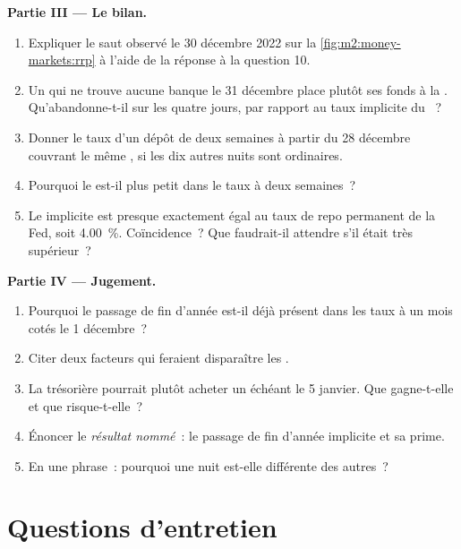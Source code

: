 \begin{problem}
\medskip\noindent\textbf{Partie III --- Le bilan.}
\begin{enumerate}[resume]
\item Expliquer le saut observé le 30 décembre 2022 sur la \cref{fig:m2:money-markets:rrp}
à l'aide de la réponse à la question 10.
\item Un  qui ne trouve aucune banque le 31 décembre place plutôt ses fonds
à la . Qu'abandonne-t-il sur les quatre jours, par rapport au
taux implicite du ~?
\item Donner le taux d'un dépôt de deux semaines à partir du 28 décembre couvrant le même
, si les dix autres nuits sont ordinaires.
\item Pourquoi le  est-il plus petit dans le taux à deux semaines~?
\item Le  implicite est presque exactement égal au taux de repo permanent
de la Fed, soit 4.00~\%. Coïncidence~? Que faudrait-il attendre s'il était très supérieur~?
\end{enumerate}

\medskip\noindent\textbf{Partie IV --- Jugement.}
\begin{enumerate}[resume]
\item Pourquoi le passage de fin d'année est-il déjà présent dans les taux à un mois cotés
le 1 décembre~?
\item Citer deux facteurs qui feraient disparaître les .
\item La trésorière pourrait plutôt acheter un  échéant le 5 janvier.
Que gagne-t-elle et que risque-t-elle~?
\item Énoncer le \emph{résultat nommé}~: le passage de fin d'année implicite et sa prime.
\item En une phrase~: pourquoi une nuit est-elle différente des autres~?
\end{enumerate}
\end{problem}

\section{Questions d'entretien}

